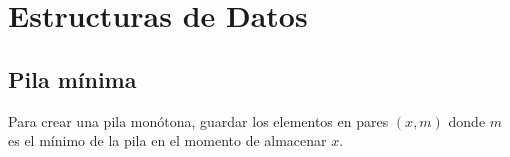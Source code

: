 \section{Estructuras de Datos}

\subsection{Pila mínima}

Para crear una pila monótona, guardar los elementos en pares \((x, m)\) donde \(m\) es el mínimo de la pila en el momento de almacenar \(x\).
